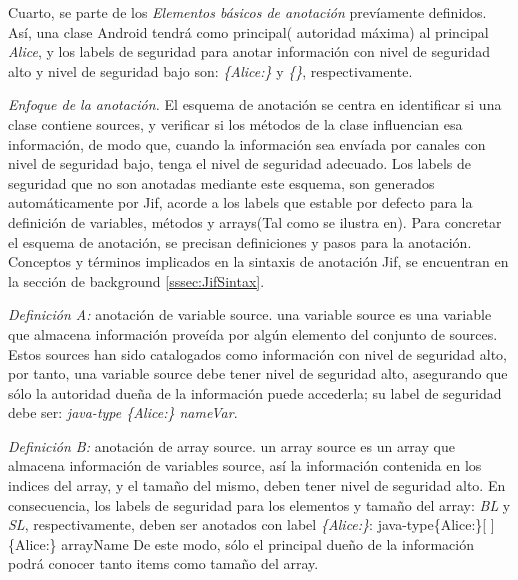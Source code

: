 Cuarto, se parte de los \textit{Elementos básicos de anotación} prevíamente
definidos. Así, una clase Android tendrá como principal( autoridad máxima) al
principal \emph{Alice}, y los labels de seguridad para anotar información con
nivel de seguridad alto y nivel de seguridad bajo son: \emph{\{Alice:\}} y
\emph{\{\}}, respectivamente.

\textit{Enfoque de la anotación.}\newline 
El esquema de anotación se centra en identificar si una clase contiene sources,
y verificar si los métodos de la clase influencian esa información, de modo que,
cuando la información sea envíada por canales con nivel de seguridad bajo, tenga
el nivel de seguridad adecuado.\newline
Los labels de seguridad que no son anotadas mediante este esquema, son generados
automáticamente por Jif, acorde a los labels que estable por defecto para la
definición de variables, métodos y arrays(Tal como se ilustra en).
Para concretar el esquema de anotación, se precisan definiciones y pasos
para la anotación.\newline
Conceptos y términos implicados en la sintaxis de anotación Jif, se
encuentran en la sección de background \ref{sssec:JifSintax}.
 
\textit{Definición A:} anotación de variable source.\newline 
una variable source es una variable que almacena información proveída por algún
elemento del conjunto de sources. Estos sources han sido catalogados como
información con nivel de seguridad alto, por tanto, una variable source debe
tener nivel de seguridad alto, asegurando que sólo la autoridad dueña de la
información puede accederla; su label de seguridad debe ser:\newline
\emph{java-type \{Alice:\} nameVar}.

\textit{Definición B:} anotación de array source.\newline
un array source es un array que almacena información de variables
source, así la información contenida en los indices del array, y el
tamaño del mismo, deben tener nivel de seguridad alto. En consecuencia, los
labels de seguridad para los elementos y tamaño del array: \emph{BL} y
\emph{SL}, respectivamente, deben ser anotados con label \emph{\{Alice:\}}: 
java-type\{Alice:\}[ ]\{Alice:\} arrayName\newline
De este modo, sólo el principal dueño de la información podrá conocer tanto
items como tamaño del array.

